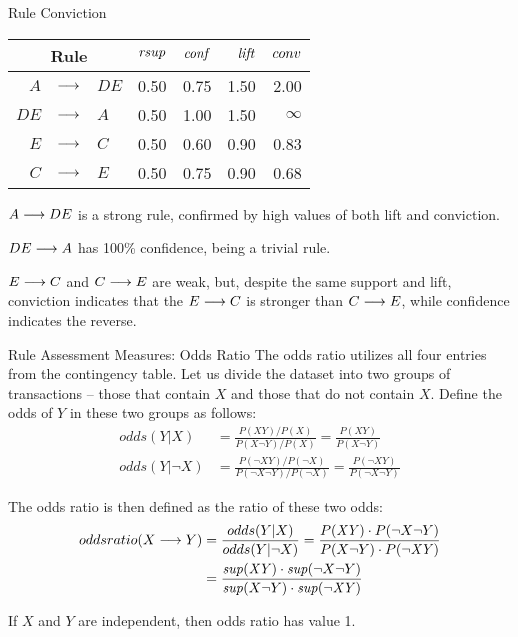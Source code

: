 \begin{frame}{Rule Conviction}
\begin{center}
\begin{tabular}{|r>{\centering}m{0.2in}l|r|r|r|r|}
\hline
\multicolumn{3}{|c|}{Rule}     & $\mathit{rsup}$ & $\mathit{conf}$ & $\mathit{lift}$    & $conv$\\ \hline
$\mathit{A}$   & $\arule$ & $\mathit{DE}$   & 0.50    & 0.75       & 1.50    & 2.00     \\ \hline
$\mathit{DE}$  & $\arule$ & $\mathit{A}$    & 0.50    & 1.00      & 1.50    & $\infty$ \\ \hline
$\mathit{E}$   & $\arule$ & $\mathit{C}$    & 0.50    & 0.60       & 0.90    & 0.83 \\ \hline
$\mathit{C}$   & $\arule$ & $\mathit{E}$    & 0.50    & 0.75       & 0.90    & 0.68 \\ \hline
\end{tabular}%
\end{center}

$A \arule DE$ is a strong rule, confirmed by high values of both lift and conviction. 

$DE \arule A$ has 100\% confidence, being a trivial rule. 

$E \arule C$ and $C \arule E$ are weak, but, despite the same support and lift, conviction indicates that the $E \arule C$ is stronger than $C \arule E$, while confidence indicates the reverse.
\end{frame}

\begin{frame}{Rule Assessment Measures: Odds Ratio}
The odds ratio utilizes all
four entries from the contingency table.
Let
us divide the dataset into two groups of transactions -- those
that contain $X$ and those that do not contain $X$. Def\/{i}ne the
odds of $Y$ in these two groups as follows:
\begin{align*}
  odds(Y|X) &= \frac{P(\mathit{XY})/P(X)}{P(X\neg Y)/P(X)}
  =\frac{P(\mathit{XY})}{P(X\neg Y)}\\
  odds(Y|\neg X) &=
  \frac{P(\neg \mathit{XY})/P(\neg X)}{P(\neg X\neg Y)/P(\neg X)}
  =\frac{P(\neg \mathit{XY})}{P(\neg X\neg Y)}
\end{align*}

The odds ratio is then def\/{i}ned as the ratio of these two odds:
\begin{align*}
  \oddsratio(X \arule Y) &= \frac{odds(Y|X)}{odds(Y|\neg X)}
   =
   \frac{P(\mathit{XY}) \cdot P(\neg  X \neg Y)}{P(X \neg Y) \cdot P(\neg \mathit{XY})}\\
   & = \frac{\supp(\mathit{XY}) \cdot \supp(\neg X\neg Y)}
    {\supp(X\neg Y)\cdot \supp(\neg \mathit{XY})}
\end{align*}

If $X$ and $Y$ are
independent, then odds ratio has value 1. 
\end{frame}


